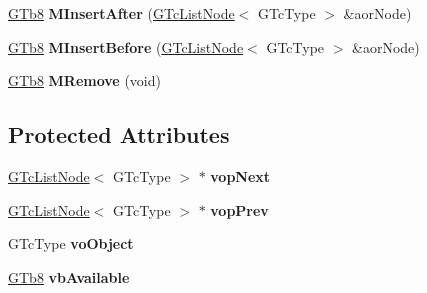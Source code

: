\begin{DoxyCompactItemize}
\mbox{\hyperlink{namespace_g_n_common_a6b5283329f609e2175dd0c91fc1520ba}{G\+Tb8}} {\bfseries M\+Insert\+After} (\mbox{\hyperlink{class_g_n_common_1_1_g_n_containers_1_1_g_tc_list_node}{G\+Tc\+List\+Node}}$<$ G\+Tc\+Type $>$ \&aor\+Node)
\item 
\mbox{\label{class_g_n_common_1_1_g_n_containers_1_1_g_tc_list_node_a0c4c25332e5b1eadd12c4cdf148dc916}} 
\mbox{\hyperlink{namespace_g_n_common_a6b5283329f609e2175dd0c91fc1520ba}{G\+Tb8}} {\bfseries M\+Insert\+Before} (\mbox{\hyperlink{class_g_n_common_1_1_g_n_containers_1_1_g_tc_list_node}{G\+Tc\+List\+Node}}$<$ G\+Tc\+Type $>$ \&aor\+Node)
\item 
\mbox{\label{class_g_n_common_1_1_g_n_containers_1_1_g_tc_list_node_a261904e5bbf43d10e124dd9c3a0f077d}} 
\mbox{\hyperlink{namespace_g_n_common_a6b5283329f609e2175dd0c91fc1520ba}{G\+Tb8}} {\bfseries M\+Remove} (void)
\end{DoxyCompactItemize}
\subsection*{Protected Attributes}
\begin{DoxyCompactItemize}
\item 
\mbox{\label{class_g_n_common_1_1_g_n_containers_1_1_g_tc_list_node_a3598f2d9cc2c1abc242320da83c5b39b}} 
\mbox{\hyperlink{class_g_n_common_1_1_g_n_containers_1_1_g_tc_list_node}{G\+Tc\+List\+Node}}$<$ G\+Tc\+Type $>$ $\ast$ {\bfseries vop\+Next}
\item 
\mbox{\label{class_g_n_common_1_1_g_n_containers_1_1_g_tc_list_node_a562fe7bfb5c331e3d4009a13579d90ac}} 
\mbox{\hyperlink{class_g_n_common_1_1_g_n_containers_1_1_g_tc_list_node}{G\+Tc\+List\+Node}}$<$ G\+Tc\+Type $>$ $\ast$ {\bfseries vop\+Prev}
\item 
\mbox{\label{class_g_n_common_1_1_g_n_containers_1_1_g_tc_list_node_a258ba42c4f6c775e823f2d2f2f20bd7f}} 
G\+Tc\+Type {\bfseries vo\+Object}
\item 
\mbox{\label{class_g_n_common_1_1_g_n_containers_1_1_g_tc_list_node_a430df0448dad8c28a8459639233b7889}} 
\mbox{\hyperlink{namespace_g_n_common_a6b5283329f609e2175dd0c91fc1520ba}{G\+Tb8}} {\bfseries vb\+Available}
\end{DoxyCompactItemize}


